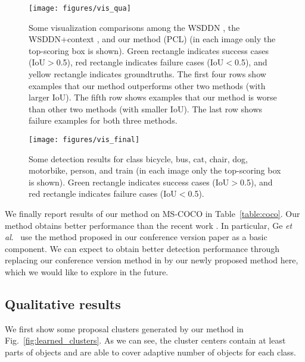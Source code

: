 \documentclass[10pt,journal,compsoc]{IEEEtran}
\def\methodname{PCL}
\def\etal{\emph{et al}.}
\begin{document}
\begin{figure*}[!t]
\begin{center}
   \texttt{[image: figures/vis\_qua]}
\end{center}
   \caption{Some visualization comparisons among the WSDDN \cite{Ref:Bilen2016}, the WSDDN+context \cite{Ref:Kantorov2016}, and our method (\methodname)
   (in each image only the top-scoring box is shown).
   Green rectangle indicates success cases (IoU$>$0.5), red rectangle indicates failure cases (IoU$<$0.5), and yellow rectangle indicates groundtruths.
   The first four rows show examples that our method outperforms other two methods (with larger IoU).
   The fifth row shows examples that our method is worse than other two methods (with smaller IoU).
   The last row shows failure examples for both three methods.
   }
\label{fig:vis_qua}
\end{figure*}



\begin{figure*}[!t]
\begin{center}
   \texttt{[image: figures/vis\_final]}
\end{center}
   \caption{Some detection results for class bicycle, bus, cat, chair, dog, motorbike, person, and train
   (in each image only the top-scoring box is shown).
   Green rectangle indicates success cases (IoU$>$0.5), and red rectangle indicates failure cases (IoU$<$0.5).
   }
\label{fig:vis_final}
\end{figure*}


{
We finally report results of our method on MS-COCO in Table~\ref{table:coco}.
Our method obtains better performance than the recent work \cite{Ref:Ge2018}.
In particular, Ge \etal\ \cite{Ref:Ge2018} use the method proposed in our conference version paper \cite{Ref:Tang2017multiple} as a basic component.
We can expect to obtain better detection performance
through replacing our conference version method in \cite{Ref:Ge2018}
by our newly proposed method here,
which we would like to explore in the future.
}



\subsection{Qualitative results}
\label{sec:qua}


We first show some proposal clusters generated by our method in Fig.~\ref{fig:learned_clusters}.
As we can see, the cluster centers contain at least parts of objects
and are able to cover adaptive number of objects for each class.
\end{document}
